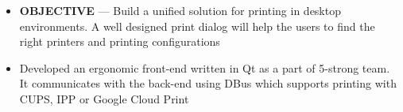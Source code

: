 \documentclass[10pt,a4paper]{altacv}
\begin{document}
\tagline{}
\personalinfo{
    \email{\href{mailto:anshulgupta0803@gmail.com}{anshulgupta0803@gmail.com}}%
    \phone{+91-916-662-8880}
    \homepage{\href{https://anshulgupta0803.github.io}{anshulgupta0803.github.io}}
}

\begin{fullwidth}
	\makecvheader
\end{fullwidth}



\begin{itemize}
	\item \textbf{OBJECTIVE} --- Build a unified solution for printing in desktop environments. A well designed print dialog will help the users to find the right printers and printing configurations
	\item Developed an ergonomic front-end written in Qt as a part of 5-strong team. It communicates with the back-end using DBus which supports printing with CUPS, IPP or Google Cloud Print
\end{itemize}

\divider
\end{document}
